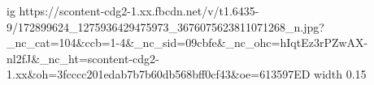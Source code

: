  
 
 
 
 

\par
\ifcmt
  ig https://scontent-cdg2-1.xx.fbcdn.net/v/t1.6435-9/172899624_1275936429475973_3676075623811071268_n.jpg?_nc_cat=104&ccb=1-4&_nc_sid=09cbfe&_nc_ohc=hIqtEz3rPZwAX-nl2fJ&_nc_ht=scontent-cdg2-1.xx&oh=3fcccc201edab7b7b60db568bff0cf43&oe=613597ED
  width 0.15
\fi
